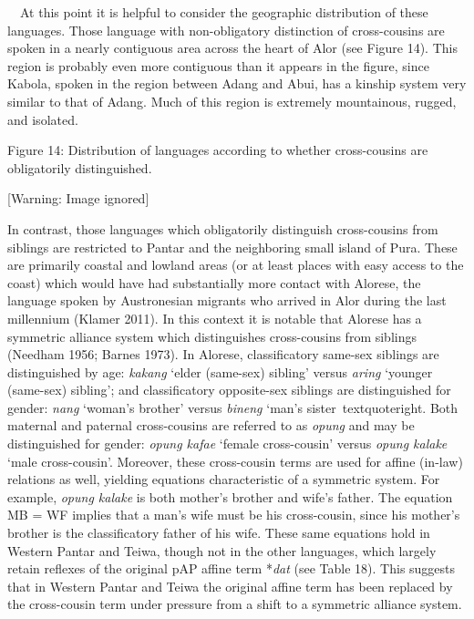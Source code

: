 \ \ At this point it is helpful to consider the geographic distribution of these languages. Those language with non-obligatory distinction of cross-cousins are spoken in a nearly contiguous area across the heart of Alor (see Figure 14). This region is probably even more contiguous than it appears in the figure, since Kabola, spoken in the region between Adang and Abui, has a kinship system very similar to that of Adang. Much of this region is extremely mountainous, rugged, and isolated.

{\centering
Figure 14: Distribution of languages according to whether  cross-cousins are obligatorily distinguished.
\par}

  [Warning: Image ignored] %
 

In contrast, those languages which obligatorily distinguish cross-cousins from siblings are restricted to Pantar and the neighboring small island of Pura. These are primarily coastal and lowland areas (or at least places with easy access to the coast) which would have had substantially more contact with Alorese, the language spoken by Austronesian migrants who arrived in Alor during the last millennium (Klamer 2011). In this context it is notable that Alorese has a symmetric alliance system which distinguishes cross-cousins from siblings (Needham 1956; Barnes 1973). In Alorese, classificatory same-sex siblings are distinguished by age: \textit{kakang }{\textquoteleft}elder (same-sex) sibling{\textquoteright} versus \textit{aring }{\textquoteleft}younger (same-sex) sibling{\textquoteright}; and classificatory opposite-sex siblings are distinguished for gender: \textit{nang} {\textquoteleft}woman{\textquoteright}s brother{\textquoteright} versus \textit{bineng }{\textquoteleft}man{\textquoteright}s sister{\
textquoteright}. Both maternal and paternal cross-cousins are referred to as \textit{opung} and may be distinguished for gender: \textit{opung kafae} {\textquoteleft}female cross-cousin{\textquoteright} versus \textit{opung kalake }{\textquoteleft}male cross-cousin{\textquoteright}. Moreover, these cross-cousin terms are used for affine (in-law) relations as well, yielding equations characteristic of a symmetric system. For example, \textit{opung kalake }is both mother{\textquoteright}s brother and wife{\textquoteright}s father. The equation MB = WF implies that a man{\textquoteright}s wife must be his cross-cousin, since his mother{\textquoteright}s brother is the classificatory father of his wife. These same equations hold in Western Pantar and Teiwa, though not in the other languages, which largely retain reflexes of the original pAP affine term *\textit{dat} (see Table 18). This suggests that in Western Pantar and Teiwa the original affine term has been replaced by the cross-cousin term under pressure 
from a shift to a symmetric alliance system. 

